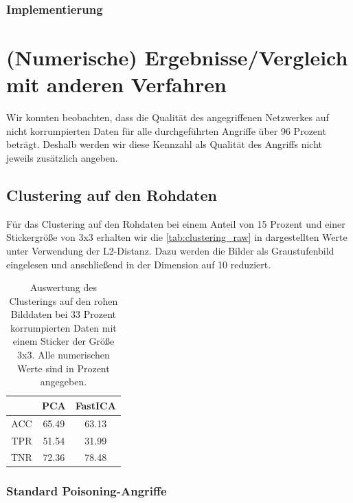 \documentclass[11pt,a4paper]{article}
\numberwithin{equation}{section}
\begin{document}
	
	\subsubsection{Implementierung}
	
	\section{(Numerische) Ergebnisse/Vergleich mit anderen Verfahren} \label{chapter_comparisons}
	
	Wir konnten beobachten, dass die Qualität des angegriffenen Netzwerkes auf nicht korrumpierten Daten für alle durchgeführten Angriffe über 96 Prozent beträgt. Deshalb werden wir diese Kennzahl als Qualität des Angriffs nicht jeweils zusätzlich angeben.
	
	\subsection{Clustering auf den Rohdaten}
	Für das Clustering auf den Rohdaten bei einem Anteil von 15 Prozent und einer Stickergröße von 3x3 erhalten wir die \autoref{tab:clustering_raw} in dargestellten Werte unter Verwendung der L2-Distanz. Dazu werden die Bilder als Graustufenbild eingelesen und anschließend in der Dimension auf 10 reduziert.
	\begin{table}[ht]
		\begin{center}
				\begin{tabular}{c|c|c}
					& PCA & FastICA \\ \hline
					ACC	 & 	65.49 & 63.13 \\
					TPR		& 51.54 & 31.99 \\
					TNR	& 72.36 	&78.48 	 
				\end{tabular}
				\caption[Auswertung des Clusterings auf den rohen Bilddaten]{Auswertung des Clusterings auf den rohen Bilddaten bei 33 Prozent korrumpierten Daten mit einem Sticker der Größe 3x3. Alle numerischen Werte sind in Prozent angegeben.}	
				\label{tab:clustering_raw}
			
			
		\end{center}
	\end{table}
	
	\subsubsection{Standard Poisoning-Angriffe}
	
\end{document}
